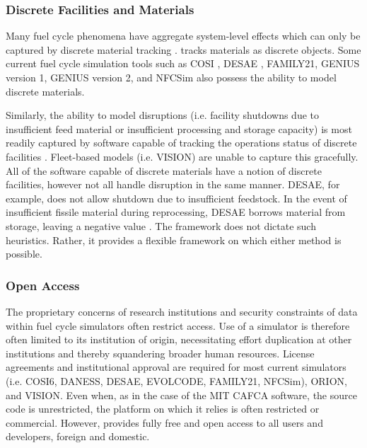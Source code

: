 
\subsubsection{Discrete Facilities and Materials}

Many fuel cycle phenomena have aggregate system-level effects which can only be
captured by discrete material tracking \cite{huff_next_2010}.  \Cyclus
tracks materials as discrete objects. Some current fuel cycle simulation tools
such as \gls{COSI}
\cite{mccarthy_benchmark_2012,grasso_nea-wpfc/fcts_2009,guerin_benchmark_2009},
\gls{DESAE}
\cite{andrianova_desae_2008}, FAMILY21\cite{mccarthy_benchmark_2012},
\gls{GENIUS} version 1, \gls{GENIUS} version 2, and \gls{NFCSim} also possess the ability to
model discrete materials.

Similarly, the ability to model disruptions (i.e. facility shutdowns due to
insufficient feed material or insufficient processing and storage capacity) is
most readily captured by software capable of tracking the operations status of
discrete facilities \cite{huff_next_2010}.  Fleet-based models (i.e.
\gls{VISION}) are unable to capture this gracefully.  All of the software
capable of discrete materials have a notion of discrete facilities, however not
all handle disruption in the same manner. \gls{DESAE}, for example, does not
allow shutdown due to insufficient feedstock. In the event
of insufficient fissile material during reprocessing, \gls{DESAE} borrows
material from storage, leaving a negative value \cite{mccarthy_benchmark_2012}.
The \Cyclus framework does not dictate such heuristics. Rather, it provides a
flexible framework on which either method is possible.

\subsubsection{Open Access}


The proprietary concerns of research institutions and security constraints of
data within fuel cycle simulators often restrict access. Use of a simulator is
therefore often limited to its institution of origin, necessitating effort
duplication at other institutions and thereby squandering broader human
resources. License agreements and institutional approval are required for most
current simulators (i.e. \gls{COSI}6, \gls{DANESS}, \gls{DESAE}, EVOLCODE,
FAMILY21, \gls{NFCSim})\cite{juchau_modeling_2010}, ORION, and VISION.  Even when, as in
the case of the MIT \gls{CAFCA} software, the source code is unrestricted, the
platform on which it relies is often restricted or commercial.  However, \Cyclus
provides fully free and open access to all users
and developers, foreign and domestic.

